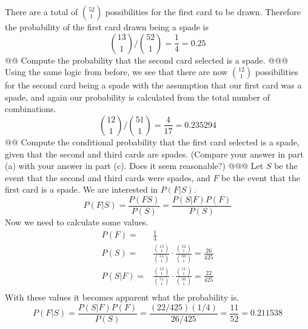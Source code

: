 \documentclass[10pt]{article}
\begin{document}
\begin{easylist}[enumerate]
    There are a total of $\binom{52}{1}$ possibilities for the first card to be drawn. Therefore the probability of the
    first card drawn being a spade is
        \[ \binom{13}{1} \Big / \binom{52}{1} = \frac{1}{4} = \boxed{0.25} \]
    @@ Compute the probability that the second card selected is a spade.
    @@@ Using the same logic from before, we see that there are now $\binom{12}{1}$ possibilities for the second card
    being a spade with the assumption that our first card was a spade, and again our probability is calculated from the
    total number of combinations.
        \[ \binom{12}{1} \Big / \binom{51}{1} = \frac{4}{17} = \boxed{0.235294} \]
    @@ Compute the conditional probability that the first card selected is a spade, given that the second and third
    cards are spades. (Compare your answer in part (a) with your answer in part (c). Does it seem reasonable?)
    @@@ Let $S$ be the event that the second and third cards were spades, and $F$ be the event that the first card is a
    spade. We are interested in $P(F|S)$.
        \[ P(F|S) = \frac{P(FS)}{P(S)} = \frac{P(S|F) P(F)}{P(S)} \]
    Now we need to calculate some values.
        \[
            \begin{aligned}
                P(F) =& \frac{1}{4}\\
                P(S) =& \frac{\binom{13}{1} }{\binom{51}{1} } \cdot \frac{\binom{12}{1} }{\binom{50}{1} } = \frac{26}{425}\\
                P(S|F) =& \frac{\binom{12}{1} }{\binom{51}{1} } \cdot \frac{\binom{11}{1} }{\binom{50}{1} } = \frac{22}{425}\\
            \end{aligned}
        \]
    With these values it becomes apparent what the probability is.
        \[ P(F|S) = \frac{P(S|F) P(F)}{P(S)} = \frac{(22/425)(1/4)}{26/425} = \frac{11}{52} = \boxed{0.211538} \]
\end{easylist}
\end{document}
